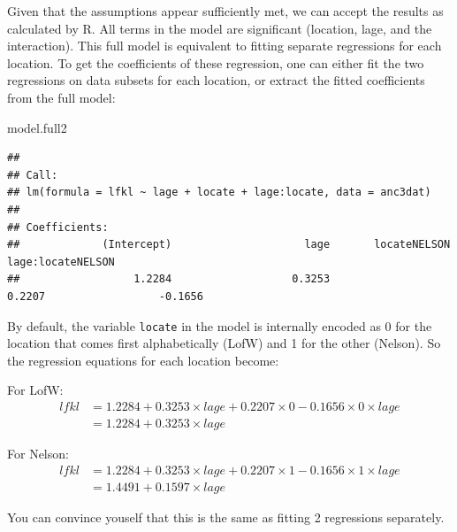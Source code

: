 \documentclass[
  12pt,
]{book}
\newenvironment{Shaded}{\begin{snugshade}}{\end{snugshade}}
\newcommand{\ControlFlowTok}[1]{\textcolor[rgb]{0.13,0.29,0.53}{\textbf{#1}}}
\newcommand{\DataTypeTok}[1]{\textcolor[rgb]{0.13,0.29,0.53}{#1}}
\newcommand{\KeywordTok}[1]{\textcolor[rgb]{0.13,0.29,0.53}{\textbf{#1}}}
\newcommand{\NormalTok}[1]{#1}
\newcommand{\OperatorTok}[1]{\textcolor[rgb]{0.81,0.36,0.00}{\textbf{#1}}}
\begin{document}
Given that the assumptions appear sufficiently met, we can accept the results as calculated by R. All terms in the model are significant (location, lage, and the interaction). This full model is equivalent to fitting separate regressions for each location. To get the coefficients of these regression, one can either fit the two regressions on data subsets for each location, or extract the fitted coefficients from the
full model:

\begin{Shaded}
\begin{Highlighting}[]
\NormalTok{model.full2}
\end{Highlighting}
\end{Shaded}

\begin{verbatim}
## 
## Call:
## lm(formula = lfkl ~ lage + locate + lage:locate, data = anc3dat)
## 
## Coefficients:
##             (Intercept)                     lage       locateNELSON        lage:locateNELSON        
##                  1.2284                   0.3253                   0.2207                  -0.1656
\end{verbatim}

By default, the variable \texttt{locate} in the model is internally encoded as 0 for the location that comes first alphabetically (LofW) and 1 for the other (Nelson). So the regression equations for each location become:

For LofW:
\[\begin{aligned}
lfkl &= 1.2284 + 0.3253 \times lage + 0.2207 \times 0 - 0.1656 \times 0 \times lage \\
 &= 1.2284 + 0.3253 \times lage
\end{aligned}\]

For Nelson:
\[\begin{aligned}
lfkl &= 1.2284 + 0.3253 \times lage + 0.2207 \times 1 - 0.1656 \times 1 \times lage \\
 &= 1.4491 + 0.1597 \times lage
\end{aligned}\]

You can convince youself that this is the same as fitting 2 regressions
separately.

\begin{Shaded}
\end{Shaded}
\end{document}
